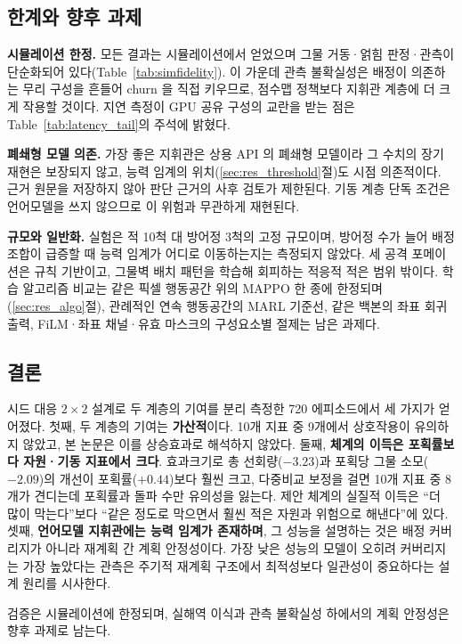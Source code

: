 \subsection{한계와 향후 과제}
\label{sec:limitations}

\textbf{시뮬레이션 한정.} 모든 결과는 시뮬레이션에서 얻었으며 그물 거동·얽힘 판정·관측이
단순화되어 있다(Table~\ref{tab:simfidelity}). 이 가운데 관측 불확실성은 배정이 의존하는 무리 구성을 흔들어 churn 을 직접 키우므로, 점수맵 정책보다
지휘관 계층에 더 크게 작용할 것이다. 지연 측정이 GPU 공유 구성의 교란을 받는 점은
Table~\ref{tab:latency_tail}의 주석에 밝혔다.

\textbf{폐쇄형 모델 의존.} 가장 좋은 지휘관은 상용 API 의 폐쇄형 모델이라 그 수치의 장기
재현은 보장되지 않고, 능력 임계의 위치(\ref{sec:res_threshold}절)도 시점 의존적이다. 근거
원문을 저장하지 않아 판단 근거의 사후 검토가 제한된다. 기동 계층 단독 조건은 언어모델을
쓰지 않으므로 이 위험과 무관하게 재현된다.

\textbf{규모와 일반화.} 실험은 적 10척 대 방어정 3척의 고정 규모이며, 방어정 수가 늘어
배정 조합이 급증할 때 능력 임계가 어디로 이동하는지는 측정되지 않았다. 세 공격 포메이션은
규칙 기반이고, 그물벽 배치 패턴을 학습해 회피하는 적응적 적은 범위 밖이다. 학습 알고리즘
비교는 같은 픽셀 행동공간 위의 MAPPO 한 종에 한정되며(\ref{sec:res_algo}절), 관례적인 연속
행동공간의 MARL 기준선, 같은 백본의 좌표 회귀 출력, FiLM·좌표 채널·유효 마스크의
구성요소별 절제는 남은 과제다.

\subsection{결론}
\label{sec:conclusion}

시드 대응 $2\times2$ 설계로 두 계층의 기여를 분리 측정한 720
에피소드에서 세 가지가 얻어졌다. 첫째, 두 계층의 기여는 \textbf{가산적}이다. 10개 지표 중
9개에서 상호작용이 유의하지 않았고, 본 논문은 이를 상승효과로 해석하지 않았다.
둘째, \textbf{체계의 이득은 포획률보다 자원·기동 지표에서 크다}. 효과크기로 총 선회량($-3.23$)과 포획당
그물 소모($-2.09$)의 개선이 포획률($+0.44$)보다 훨씬 크고, 다중비교 보정을 걸면 10개 지표 중
8개가 견디는데 포획률과 돌파 수만 유의성을 잃는다. 제안 체계의 실질적 이득은 ``더 많이
막는다''보다 ``같은 정도로 막으면서 훨씬 적은 자원과 위험으로 해낸다''에 있다. 셋째,
\textbf{언어모델 지휘관에는 능력 임계가 존재하며}, 그 성능을 설명하는 것은 배정 커버리지가
아니라 재계획 간 계획 안정성이다. 가장 낮은 성능의 모델이 오히려 커버리지는 가장 높았다는
관측은 주기적 재계획 구조에서 최적성보다 일관성이 중요하다는 설계 원리를 시사한다.

검증은 시뮬레이션에 한정되며, 실해역 이식과 관측 불확실성 하에서의 계획 안정성은 향후 과제로
남는다.
